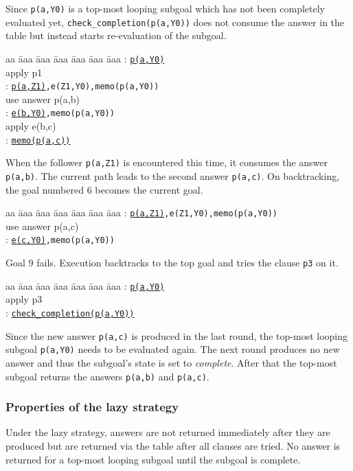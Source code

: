 \documentclass{tlp}
\begin{document}
Since {\tt p(a,Y0)} is a top-most looping subgoal which has not been completely evaluated yet, {\tt check\_completion(p(a,Y0))} does not consume the answer in the table but instead starts re-evaluation of the subgoal.
\begin{tabbing}
aa \= aaa \= aaa \= aaa \= aaa \= aaa \= aaa \kill
\> : {\tt \underline{p(a,Y0)}} \\
\> \> \> {\scriptsize apply p1} \\
\> : {\tt \underline{p(a,Z1)},e(Z1,Y0),memo(p(a,Y0))} \\
\> \> \> {\scriptsize use answer p(a,b)} \\
\> : {\tt \underline{e(b,Y0)},memo(p(a,Y0))} \\
\> \> \> {\scriptsize apply e(b,c)} \\
\> : {\tt \underline{memo(p(a,c))}}
\end{tabbing}      
When the follower {\tt p(a,Z1)} is encountered this time, it consumes the answer {\tt p(a,b)}. The current path leads to the second answer {\tt p(a,c)}. On backtracking, the goal numbered 6 becomes the current goal. 
\begin{tabbing}
aa \= aaa \= aaa \= aaa \= aaa \= aaa \= aaa \kill
\> : {\tt \underline{p(a,Z1)},e(Z1,Y0),memo(p(a,Y0))} \\
\> \> \> {\scriptsize use answer p(a,c)} \\
\> : {\tt \underline{e(c,Y0)},memo(p(a,Y0))}
\end{tabbing}
Goal 9 fails. Execution backtracks to the top goal and tries the clause {\tt p3} on it.
\begin{tabbing}
aa \= aaa \= aaa \= aaa \= aaa \= aaa \= aaa \kill
\> : {\tt \underline{p(a,Y0)}} \\
\> \> \>  {\scriptsize apply p3} \\
\> : {\tt \underline{check\_completion(p(a,Y0))}} 
\end{tabbing}      
Since the new answer {\tt p(a,c)} is produced in the last round, the top-most looping subgoal {\tt p(a,Y0)} needs to be evaluated again. The next round produces no new answer and thus the subgoal's state is set to {\it complete}. After that the top-most subgoal returns the answers {\tt p(a,b)} and {\tt p(a,c)}.

\subsubsection{\label{sec:eager-property}Properties of the lazy strategy}
Under the lazy strategy, answers are not returned immediately after they are produced but are returned via the table after all clauses are tried. No answer is returned for a top-most looping subgoal until the subgoal is complete.
\end{document}
